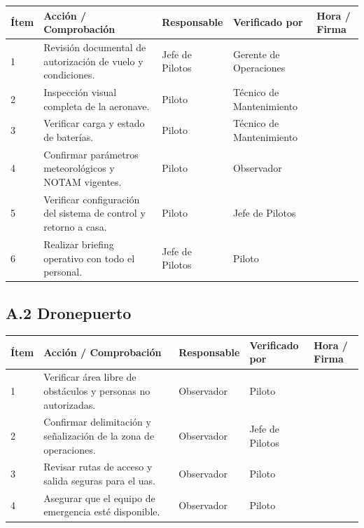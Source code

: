 \begin{table}[H]
    \centering
    \begin{tabular}{|p{0.8cm}|p{7cm}|p{2.5cm}|p{2.5cm}|p{2.5cm}|}
        \hline
        \textbf{Ítem} & \textbf{Acción / Comprobación} & \textbf{Responsable} & \textbf{Verificado por} & \textbf{Hora / Firma} \\ \hline
        1 & Revisión documental de autorización de vuelo y condiciones. & Jefe de Pilotos & Gerente de Operaciones &  \\ \hline
        2 & Inspección visual completa de la aeronave. & Piloto & Técnico de Mantenimiento &  \\ \hline
        3 & Verificar carga y estado de baterías. & Piloto & Técnico de Mantenimiento &  \\ \hline
        4 & Confirmar parámetros meteorológicos y NOTAM vigentes. & Piloto & Observador &  \\ \hline
        5 & Verificar configuración del sistema de control y retorno a casa. & Piloto & Jefe de Pilotos &  \\ \hline
        6 & Realizar briefing operativo con todo el personal. & Jefe de Pilotos & Piloto &  \\ \hline
    \end{tabular}
\end{table}

\subsection*{A.2 Dronepuerto}

\begin{table}[H]
    \centering
    \begin{tabular}{|p{0.8cm}|p{7cm}|p{2.5cm}|p{2.5cm}|p{2.5cm}|}
        \hline
        \textbf{Ítem} & \textbf{Acción / Comprobación} & \textbf{Responsable} & \textbf{Verificado por} & \textbf{Hora / Firma} \\ \hline
        1 & Verificar área libre de obstáculos y personas no autorizadas. & Observador & Piloto &  \\ \hline
        2 & Confirmar delimitación y señalización de la zona de operaciones. & Observador & Jefe de Pilotos &  \\ \hline
        3 & Revisar rutas de acceso y salida seguras para el \gls{uas}. & Observador & Piloto &  \\ \hline
        4 & Asegurar que el equipo de emergencia esté disponible. & Observador & Piloto &  \\ \hline
    \end{tabular}
\end{table}

